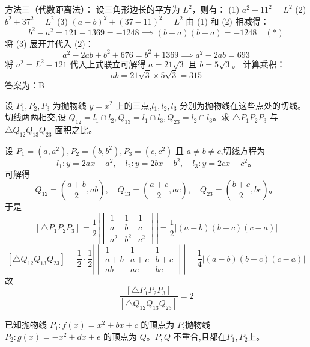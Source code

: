 \begin{questions}
\begin{solution}
方法三（代数距离法）：
设三角形边长的平方为 $L^2$，则有：
(1) $a^2 + 11^2 = L^2$
(2) $b^2 + 37^2 = L^2$
(3) $(a - b)^2 + (37 - 11)^2 = L^2$
由 (1) 和 (2) 相减得：
\[
b^2 - a^2 = 121 - 1369 = -1248 \implies (b - a)(b + a) = -1248 \quad (*)
\]
将 (3) 展开并代入 (2)：
\[
a^2 - 2ab + b^2 + 676 = b^2 + 1369 \implies a^2 - 2ab = 693
\]
将 $a^2 = L^2 - 121$ 代入上式联立可解得 $a = 21\sqrt{3}$ 且 $b = 5\sqrt{3}$。
计算乘积：
\[
ab = 21\sqrt{3} \times 5\sqrt{3} = 315
\]
答案为：B
\end{solution}

    \question 设 $P_1, P_2, P_3$ 为抛物线 $y=x^2$ 上的三点,$l_1, l_2, l_3$ 分别为抛物线在这些点处的切线。切线两两相交,设 $Q_{12}=l_1 \cap l_2, Q_{13}=l_1 \cap l_3, Q_{23}=l_2 \cap l_3$。求 $\triangle P_1P_2P_3$ 与 $\triangle Q_{12}Q_{13}Q_{23}$ 面积之比。
    \begin{solution}
        设 $P_1=(a,a^2), P_2=(b,b^2), P_3=(c,c^2)$ 且 $a \neq b \neq c$,切线方程为
        \[
        l_1: y = 2ax - a^2, \quad l_2: y = 2bx - b^2, \quad l_3: y = 2cx - c^2。
        \]
        可解得
        \[
        Q_{12} = \left(\frac{a+b}{2}, ab\right), \quad Q_{13} = \left(\frac{a+c}{2}, ac\right), \quad Q_{23} = \left(\frac{b+c}{2}, bc\right)。
        \]
        于是
        \[
        [\triangle P_1P_2P_3] = \frac{1}{2}
        \left|\begin{vmatrix}
        1 & 1 & 1 \\
        a & b & c \\
        a^2 & b^2 & c^2
        \end{vmatrix}\right|
        =\frac{1}{2}|(a-b)(b-c)(c-a)|
        \]
        \[
        [\triangle Q_{12}Q_{13}Q_{23}] = \frac{1}{2} \cdot \frac{1}{2}
        \left|\begin{vmatrix}
        1 & 1 & 1 \\
        a+b & a+c & b+c \\
        ab & ac & bc
        \end{vmatrix}\right|
        =\frac{1}{4}|(a-b)(b-c)(c-a)|
        \]
        故
        \[
        \frac{[\triangle P_1P_2P_3]}{[\triangle Q_{12}Q_{13}Q_{23}]} = 2
        \]
    \end{solution}

    \question 已知抛物线 $P_1: f(x) = x^2 + bx + c$ 的顶点为 $P$,抛物线 $P_2: g(x) = -x^2 + dx + e$ 的顶点为 $Q$。$P,Q$ 不重合,且都在$P_1,P_2$上。
\end{questions}

